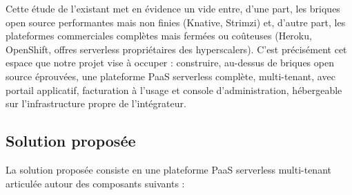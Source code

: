 Cette étude de l'existant met en évidence un vide entre, d'une part, les briques open source performantes mais non finies (Knative, Strimzi) et, d'autre part, les plateformes commerciales complètes mais fermées ou coûteuses (Heroku, OpenShift, offres serverless propriétaires des hyperscalers). C'est précisément cet espace que notre projet vise à occuper : construire, au-dessus de briques open source éprouvées, une plateforme PaaS serverless complète, multi-tenant, avec portail applicatif, facturation à l'usage et console d'administration, hébergeable sur l'infrastructure propre de l'intégrateur.

\subsection{Solution proposée}

La solution proposée consiste en une plateforme PaaS serverless multi-tenant articulée autour des composants suivants :

